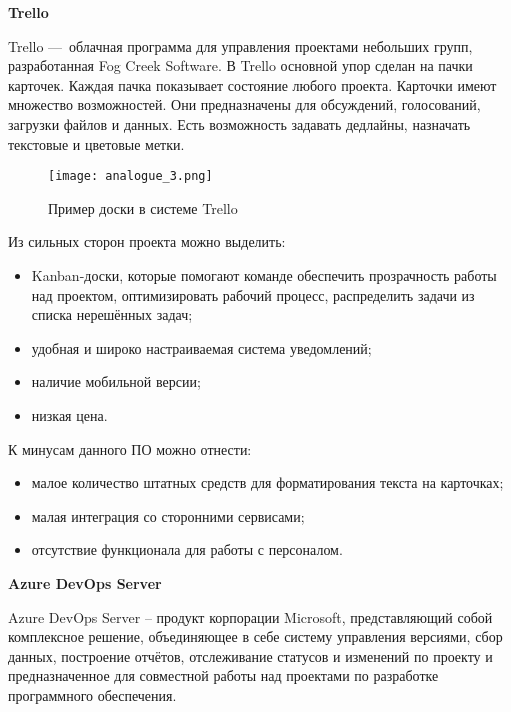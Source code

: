 \textbf{Trello}

Trello — облачная программа для управления проектами небольших групп, разработанная Fog Creek Software. В Trello основной упор сделан на пачки карточек. Каждая пачка показывает состояние любого проекта. Карточки имеют множество возможностей. Они предназначены для обсуждений, голосований, загрузки файлов и данных. Есть возможность задавать дедлайны, назначать текстовые и цветовые метки.

\begin{figure}[ht]
    \centering
	\texttt{[image: analogue\_3.png]}
	\caption{Пример доски в системе Trello}\label{fig:analysis:analogue_3:picture}
\end{figure}

Из сильных сторон проекта можно выделить:
\begin{itemize}
    \item Kanban-доски, которые помогают команде обеспечить прозрачность работы над проектом, оптимизировать рабочий процесс, распределить задачи из списка нерешённых задач;
    \item удобная и широко настраиваемая система уведомлений;
    \item наличие мобильной версии;
    \item низкая цена.
\end{itemize}

К минусам данного ПО можно отнести:
\begin{itemize}
    \item малое количество штатных средств для форматирования текста на карточках;
    \item малая интеграция со сторонними сервисами;
    \item отсутствие функционала для работы с персоналом.
\end{itemize}

\textbf{Azure DevOps Server}

Azure DevOps Server – продукт корпорации Microsoft, представляющий собой комплексное решение, объединяющее в себе систему управления версиями, сбор данных, построение отчётов, отслеживание статусов и изменений по проекту и предназначенное для совместной работы над проектами по разработке программного обеспечения.

